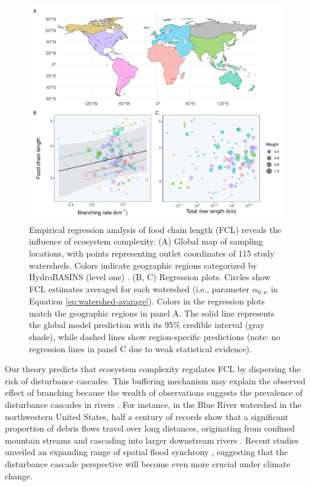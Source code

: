 \documentclass[11pt, class=article, crop=false]{standalone}
\begin{document}
\begin{figure}
    \centering
    \includegraphics[width=0.9\linewidth]{data_fmt/fig_emp_fcl.pdf}
    \caption{Empirical regression analysis of food chain length (FCL) reveals the influence of ecosystem complexity. (A) Global map of sampling locations, with points representing outlet coordinates of 115 study watersheds. Colors indicate geographic regions categorized by HydroBASINS (level one) \citep{lehner_global_2013}. (B, C) Regression plots. Circles show FCL estimates averaged for each watershed (i.e., parameter $\alpha_{0,w}$ in Equation \ref{eq:watershed-avarage}). Colors in the regression plots match the geographic regions in panel A. The solid line represents the global model prediction with its 95\% credible interval (gray shade), while dashed lines show region-specific predictions (note: no regression lines in panel C due to weak statistical evidence).}
    \label{fig:fcl-obs}
\end{figure}

Our theory predicts that ecosystem complexity regulates FCL by dispersing the risk of disturbance cascades.
This buffering mechanism may explain the observed effect of branching because the wealth of observations suggests the prevalence of disturbance cascades in rivers \citep{swanson_flood_1998, nakamura_disturbance_2000, berghuijs_growing_2019, sarremejane_drought_2021, sharma_spatial_2024}.
For instance, in the Blue River watershed in the northwestern United States, half a century of records show that a significant proportion of debris flows travel over long distances, originating from confined mountain streams and cascading into larger downstream rivers \citep{nakamura_disturbance_2000}.
Recent studies unveiled an expanding range of spatial flood synchrony \citep{berghuijs_growing_2019, sharma_spatial_2024}, suggesting that the disturbance cascade perspective will become even more crucial under climate change.
\end{document}
